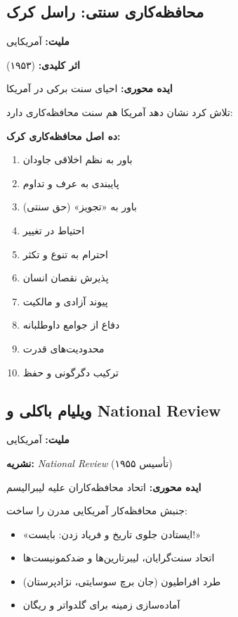 \subsection{محافظه‌کاری سنتی: راسل کرک}

\begin{personbox}

\textbf{ملیت:} آمریکایی

\textbf{اثر کلیدی:}  (۱۹۵۳)

\textbf{ایده محوری:} احیای سنت برکی در آمریکا

\mediumspace

 تلاش کرد نشان دهد آمریکا هم سنت محافظه‌کاری دارد:

\textbf{ده اصل محافظه‌کاری کرک:}
\begin{enumerate}[nosep]
    \item باور به نظم اخلاقی جاودان
    \item پایبندی به عرف و تداوم
    \item باور به «تجویز» (حق سنتی)
    \item احتیاط در تغییر
    \item احترام به تنوع و تکثر
    \item پذیرش نقصان انسان
    \item پیوند آزادی و مالکیت
    \item دفاع از جوامع داوطلبانه
    \item محدودیت‌های قدرت
    \item ترکیب دگرگونی و حفظ
\end{enumerate}
\end{personbox}

\subsection{ویلیام باکلی و National Review}

\begin{personbox}

\textbf{ملیت:} آمریکایی

\textbf{نشریه:} \textit{National Review} (تأسیس ۱۹۵۵)

\textbf{ایده محوری:} اتحاد محافظه‌کاران علیه لیبرالیسم

\mediumspace

 جنبش محافظه‌کار آمریکایی مدرن را ساخت:

\begin{itemize}[nosep]
    \item «ایستادن جلوی تاریخ و فریاد زدن: بایست!»
    \item اتحاد سنت‌گرایان، لیبرتارین‌ها و ضدکمونیست‌ها
    \item طرد افراطیون (جان برچ سوسایتی، نژادپرستان)
    \item آماده‌سازی زمینه برای گلدواتر و ریگان
\end{itemize}
\end{personbox}

